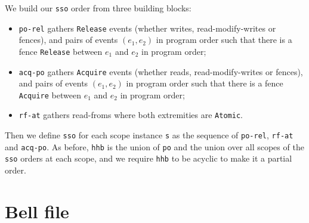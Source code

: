 \documentclass[a4paper]{article}
\begin{document}
We build our {\tt sso} order from three building blocks:
\begin{itemize}
\item {\tt po-rel} gathers {\tt Release} events (whether writes,
read-modify-writes or fences), and pairs of events $(e_1,e_2)$ in program order
such that there is a fence {\tt Release} between $e_1$ and $e_2$ in program
order;
\item {\tt acq-po} gathers {\tt Acquire} events (whether reads,
read-modify-writes or fences), and pairs of events $(e_1,e_2)$ in program order
such that there is a fence {\tt Acquire} between $e_1$ and $e_2$ in program
order;
\item {\tt rf-at} gathers read-froms where both extremities are {\tt Atomic}. 
\end{itemize}
Then we define {\tt sso} for each scope instance {\tt s} as the sequence of
{\tt po-rel}, {\tt rf-at} and {\tt acq-po}. As before, {\tt hhb} is the union
of {\tt po} and the union over all scopes of the {\tt sso} orders at each
scope, and we require {\tt hhb} to be acyclic to make it a partial order.

\clearpage

\appendix
\section{Bell file \label{app:bell}}
\end{document}
